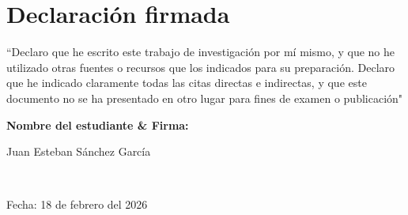 \newcommand*\wildcard[2][6cm]{\vspace{2cm}\parbox{#1}{\hrulefill\par#2}} 

\section*{Declaración firmada}

\vspace{1cm}

“Declaro que he escrito este trabajo de investigación por mí mismo, y que no he utilizado otras fuentes o recursos que los indicados para su preparación. Declaro que he indicado claramente todas las citas directas e indirectas, y que este documento no se ha presentado en otro lugar para fines de examen o publicación"

\vspace{3cm}
\textbf{Nombre del estudiante \& Firma:}
\vspace{1cm}

\begingroup

    \begin{center}
        \wildcard{\centerline{Juan Esteban Sánchez García} ~\\ \centerline{Fecha: 18 de febrero del 2026}}
       
    \end{center}

\endgroup


\pagebreak